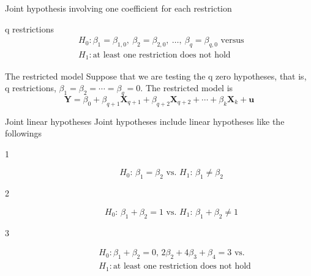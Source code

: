 \documentclass[presentation,10pt]{beamer}
\begin{document}
\begin{frame}[label={sec:orgfa10ae8}]{Joint hypothesis involving one coefficient for each restriction}
\begin{block}{q restrictions}
\begin{align*}
&H_0: \beta_1 = \beta_{1,0},\ \beta_2 = \beta_{2,0},\ \ldots,\ \beta_q = \beta_{q,0} \text{ versus } \\
&H_1: \text{at least one restriction does not hold}
\end{align*}
\end{block}

\begin{block}{The restricted model}
Suppose that we are testing the q zero hypotheses, that is, q
restrictions, \(\beta_1 = \beta_2 = \cdots = \beta_q = 0\). The
restricted model is
\begin{equation}
\label{eq:restmodel-2}
\mathbf{Y} = \beta_0 + \beta_{q+1} \mathbf{X}_{q+1} + \beta_{q+2} \mathbf{X}_{q+2} + \cdots + \beta_k \mathbf{X}_k + \mathbf{u}
\end{equation}
\end{block}
\end{frame}

\begin{frame}[label={sec:org49d28b7}]{Joint linear hypotheses}
Joint hypotheses include \alert{linear hypotheses} like the followings

\begin{description}
\item[{1}] \begin{equation*}
H_0:\, \beta_1 = \beta_2 \text{ vs. } H_1:\, \beta_1 \neq \beta_2
\end{equation*}

\item[{2}] \begin{equation*}
H_0:\, \beta_1 + \beta_2 = 1 \text{ vs. } H_1:\, \beta_1 + \beta_2 \neq 1
\end{equation*}

\item[{3}] \begin{align*}
&H_0: \beta_1 + \beta_2 = 0,\, 2\beta_2 + 4\beta_3 + \beta_4 = 3 \text{ vs. } \\
&H_1: \text{at least one restriction does not hold}
\end{align*}
\end{description}
\end{frame}
\end{document}
